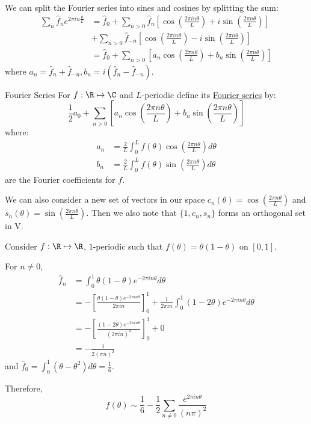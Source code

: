 \documentclass[../Main.tex]{subfiles}
\begin{document}
We can split the Fourier series into sines and cosines by splitting the sum:
\begin{align*}
    \sum_n \hat{f}_n e^{2\pi i n \frac{\theta}{L}} &= \hat{f}_0 + \sum_{n > 0} \hat{f}_n \left[\cos\left(\frac{2\pi i n \theta}{L}\right) + i\sin\left(\frac{2\pi n \theta}{L}\right)\right] \\
    &+ \sum_{n > 0} \hat{f}_{-n} \left[\cos\left(\frac{2\pi i n \theta}{L}\right) - i\sin\left(\frac{2\pi n \theta}{L}\right)\right] \\ 
    &= \hat{f}_0 + \sum_{n > 0} \left[a_n \cos\left(\frac{2\pi n \theta}{L}\right) + b_n \sin \left(\frac{2\pi n \theta}{L}\right)\right]
\end{align*}
where $a_n = \hat{f}_n + \hat{f}_{-n}, b_n = i (\hat{f}_n - \hat{f}_{-n})$.
\begin{definition}{Fourier Series}
    For $f : \R \mapsto \C$ and $L$-periodic define its \underline{Fourier series} by:
    \begin{equation}
        \frac{1}{2} a_0 + \sum_{n > 0} \left[a_n \cos\left(\frac{2\pi n \theta}{L}\right) + b_n \sin \left(\frac{2\pi n \theta}{L}\right)\right]
        \label{eqnFourierSeries}
    \end{equation}
    where:
    \begin{align*}
        a_n &= \frac{2}{L} \int_0^L f(\theta) \cos\left(\frac{2\pi n \theta}{L}\right)d\theta \\
        b_n &= \frac{2}{L} \int_0^L f(\theta) \sin\left(\frac{2\pi n \theta}{L}\right)d\theta
    \end{align*}
    are the Fourier coefficients for $f$.
\end{definition}
We can also consider a new set of vectors in our space $c_n(\theta) = \cos\left(\frac{2\pi n \theta}{L}\right)$ and $s_n(\theta) = \sin\left(\frac{2\pi n \theta}{L}\right)$. Then we also note that $\{1, c_n, s_n\}$ forms an orthogonal set in V.

\begin{example}
    Consider $f : \R \mapsto \R$, $1$-periodic such that $f(\theta) = \theta(1-\theta)$ on $[0, 1]$.

    For $n \neq 0$,
    \begin{align*}
        \hat{f}_n &= \int_0^1 \theta(1-\theta) e^{-2\pi i n \theta} d\theta \\
        &= -\left[\frac{\theta(1-\theta) e^{-2\pi i n \theta}}{2 \pi i n}\right]_0^1 + \frac{1}{2\pi i n} \int_0^1 (1 - 2\theta) e^{-2\pi i n \theta}d\theta \\
        &= -\left[\frac{(1-2\theta) e^{-2\pi i n \theta}}{(2 \pi i n)^2}\right]_0^1 + 0 \\
        &= -\frac{1}{2(\pi n)^2}
    \end{align*}
    and $\hat{f}_0 = \int_0^1 (\theta - \theta^2) d\theta = \frac16$.

    Therefore,
    \begin{equation*}
        f(\theta) \sim \frac{1}{6} - \frac{1}{2} \sum_{n \neq 0} \frac{e^{2\pi i n \theta}}{(n \pi)^2}
    \end{equation*}
\end{example}
\end{document}
